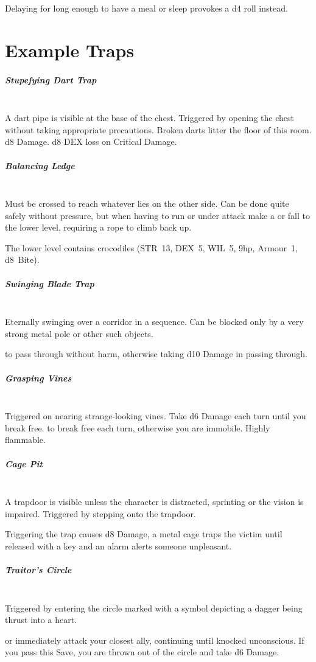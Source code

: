 \documentclass[itdr]{subfiles}
\begin{document}
Delaying for long enough to have a meal or sleep provokes a d4 roll instead.

\section{Example Traps}

\subparagraph{Stupefying Dart Trap}~\\
A dart pipe is visible at the base of the chest. Triggered by opening the chest without taking appropriate precautions. Broken darts litter the floor of this room.
d8 Damage. d8 DEX loss on Critical Damage.

\subparagraph{Balancing Ledge}~\\
Must be crossed to reach whatever lies on the other side. Can be done quite safely without pressure, but when having to run or under attack make a  or fall to the lower level, requiring a rope to climb back up.

The lower level contains crocodiles (STR~13, DEX~5, WIL~5, 9hp, Armour~1, d8~Bite).

\subparagraph{Swinging Blade Trap}~\\
Eternally swinging over a corridor in a sequence. Can be blocked only by a very strong metal pole or other such objects.

 to pass through without harm, otherwise taking d10 Damage in passing through.

\subparagraph{Grasping Vines}~\\
Triggered on nearing strange-looking vines. Take d6 Damage each turn until you break free.  to break free each turn, otherwise you are immobile. Highly flammable.

\subparagraph{Cage Pit}~\\
A trapdoor is visible unless the character is distracted, sprinting or the vision is impaired. Triggered by stepping onto the trapdoor.

Triggering the trap causes d8 Damage, a metal cage traps the victim until released with a key and an alarm alerts someone unpleasant.

\subparagraph{Traitor's Circle}~\\
Triggered by entering the circle marked with a symbol depicting a dagger being thrust into a heart.

 or immediately attack your closest ally, continuing until knocked unconscious. If you pass this Save, you are thrown out of the circle and take d6 Damage.

\vfill
\break

\end{document}
